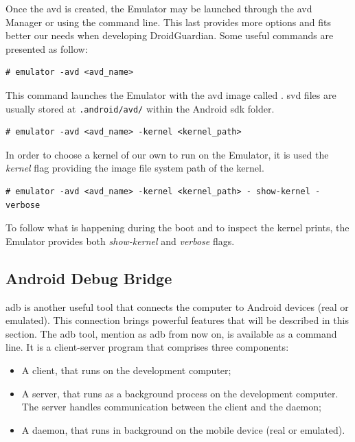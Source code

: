 Once the \gls{avd} is created, the Emulator may be launched through the \gls{avd} Manager or using the command line. This last provides more options and fits better our needs when developing DroidGuardian. Some useful commands are presented as follow:


\begin{lstlisting}[style=BashInputStyle]
# emulator -avd <avd_name>
\end{lstlisting}

This command launches the Emulator with the \gls{avd} image called . \gls{svd} files are usually stored at \texttt{.android/avd/} within the Android \gls{sdk} folder.

\begin{lstlisting}[style=BashInputStyle]
# emulator -avd <avd_name> -kernel <kernel_path>
\end{lstlisting}

In order to choose a kernel of our own to run on the Emulator, it is used the \textit{kernel} flag providing the image file system path of the kernel.

 \begin{lstlisting}[style=BashInputStyle]
# emulator -avd <avd_name> -kernel <kernel_path> - show-kernel -verbose
\end{lstlisting}

To follow what is happening during the boot and to inspect the kernel prints, the Emulator provides both \textit{show-kernel} and \textit{verbose} flags.

\subsection{Android Debug Bridge}

\gls{adb} is another useful tool that connects the computer to Android devices (real or emulated). This connection brings powerful features that will be described in this section. The \gls{adb} tool, mention as adb from now on, is available as a command line. It is a client-server program that comprises three components:

\begin{itemize}
\item A client, that runs on the development computer;
\item A server, that runs as a background process on the development computer. The server handles communication between the client and the daemon;
\item A daemon, that runs in background on the mobile device (real or emulated).
\end{itemize}

